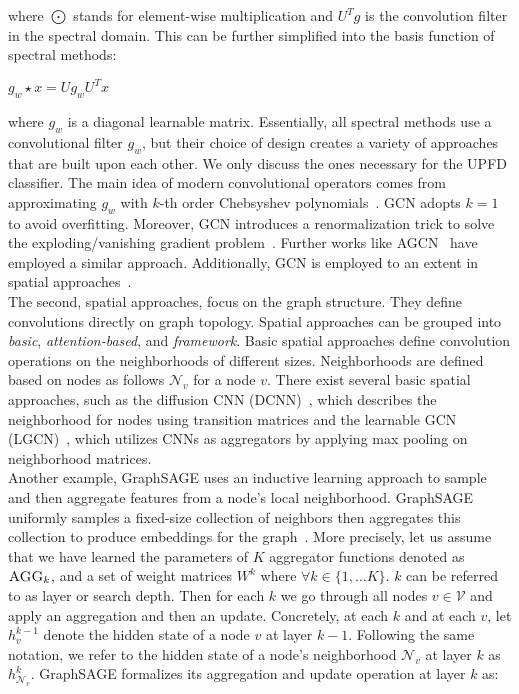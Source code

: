 where $\bigodot$ stands for element-wise multiplication and $U^Tg$ is the convolution filter in the spectral domain. This can be further simplified into the basis function of spectral methods:
\begin{center}
    $g_w \star x = U g_w U^T x$
\end{center}
where $g_w$ is a diagonal learnable matrix. Essentially, all spectral methods use a convolutional filter $g_w$, but their choice of design creates a variety of approaches that are built upon each other. We only discuss the ones necessary for the UPFD classifier. The main idea of modern convolutional operators comes from approximating $g_w$ with $k$-th order Chebsyshev polynomials~\parencite{GNNsAReview_Zhou}. GCN adopts $k=1$ to avoid overfitting. Moreover, GCN introduces a renormalization trick to solve the exploding/vanishing gradient problem~\parencite{GCN_Kipf}. Further works like AGCN~\parencite{AGCN_Li} have employed a similar approach. Additionally, GCN is employed to an extent in spatial approaches~\parencite{GNNsAReview_Zhou}.\\
The second, spatial approaches, focus on the graph structure. They define convolutions directly on graph topology. Spatial approaches can be grouped into \emph{basic}, \emph{attention-based}, and \emph{framework}. Basic spatial approaches define convolution operations on the neighborhoods of different sizes. Neighborhoods are defined based on nodes as follows $\mathcal{N}_v$ for a node $v$. There exist several basic spatial approaches, such as the diffusion CNN (DCNN)~\parencite{DCNN_Atwood}, which describes the neighborhood for nodes using transition matrices and the learnable GCN (LGCN)~\parencite{LGCN_Gao}, which utilizes CNNs as aggregators by applying max pooling on neighborhood matrices.\\
Another example, GraphSAGE uses an inductive learning approach to sample and then aggregate features from a node's local neighborhood. GraphSAGE uniformly samples a fixed-size collection of neighbors then aggregates this collection to produce embeddings for the graph~\parencite{GraphSAGE_Hamilton}. More precisely, let us assume that we have learned the parameters of $K$ aggregator functions denoted as $\textsc{AGG}_k$, and a set of weight matrices $W^k$ where $\forall k \in \{1, \dots K\}$. $k$ can be referred to as layer or search depth. Then for each $k$ we go through all nodes $v \in \mathcal{V}$ and apply an aggregation and then an update. Concretely, at each $k$ and at each $v$, let $h_v^{k-1}$ denote the hidden state of a node $v$ at layer $k-1$. Following the same notation, we refer to the hidden state of a node's neighborhood $\mathcal{N}_v$ at layer $k$ as $h_{\mathcal{N}_v}^k$. GraphSAGE formalizes its aggregation and update operation at layer $k$ as:
